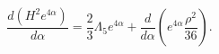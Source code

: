 \begin{equation}
\frac{d(H^2 e^{4\alpha})}{d\alpha} = 
\frac{2}{3}\Lambda_5 e^{4\alpha} 
+ \frac{d}{d\alpha}\left( e^{4\alpha} \frac{\rho^2}{36}\right).
\end{equation}

